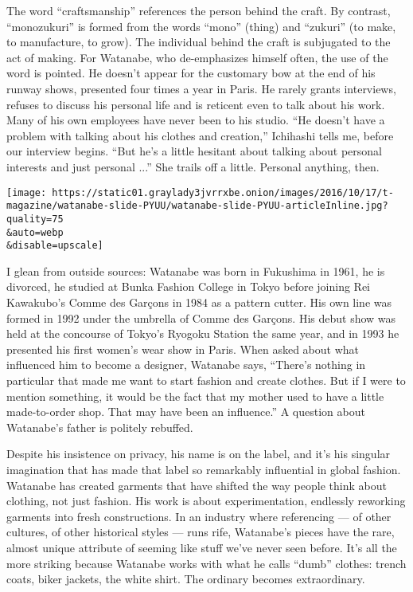 The word ``craftsmanship'' references the person behind the craft. By
contrast, ``monozukuri'' is formed from the words ``mono'' (thing) and
­``zukuri'' (to make, to manufacture, to grow). The individual behind
the craft is subjugated to the act of making. For Watanabe, who
de­-emphasizes himself often, the use of the word is pointed. He doesn't
appear for the customary bow at the end of his runway shows, presented
four times a year in Paris. He rarely grants interviews, refuses to
discuss his personal life and is reticent even to talk about his work.
Many of his own employees have never been to his studio. ``He doesn't
have a problem with talking about his clothes and creation,'' Ichihashi
tells me, before our interview begins. ``But he's a little hesitant
about talking about personal interests and just personal ...'' She
trails off a little. Personal anything, then.

\texttt{[image: https://static01.graylady3jvrrxbe.onion/images/2016/10/17/t-magazine/watanabe-slide-PYUU/watanabe-slide-PYUU-articleInline.jpg?quality=75\\\&auto=webp\\\&disable=upscale]}

I glean from outside sources: Watanabe was born in Fukushima in 1961, he
is divorced, he studied at Bunka Fashion College in Tokyo before joining
Rei Kawakubo's Comme des Garçons in 1984 as a pattern cutter. His own
line was formed in 1992 under the umbrella of Comme des Garçons. His
debut show was held at the concourse of Tokyo's Ryogoku Station the same
year, and in 1993 he presented his first women's wear show in Paris.
When asked about what influenced him to become a designer, Watanabe
says, ``There's nothing in particular that made me want to start fashion
and create clothes. But if I were to mention something, it would be the
fact that my mother used to have a little made-­to-­order shop. That may
have been an influence.'' A question about Watanabe's father is politely
rebuffed.

Despite his insistence on privacy, his name is on the label, and it's
his singular imagination that has made that label so remarkably
influential in global fashion. Watanabe has created garments that have
shifted the way people think about clothing, not just fashion. His work
is about experimentation, endlessly reworking garments into fresh
constructions. In an industry where referencing --- of other cultures,
of other historical styles --- runs rife, Watanabe's pieces have the
rare, almost unique attribute of seeming like stuff we've never seen
before. It's all the more striking because Watanabe works with what he
calls ``dumb'' clothes: trench coats, biker jackets, the white shirt.
The ordinary becomes extraordinary.

